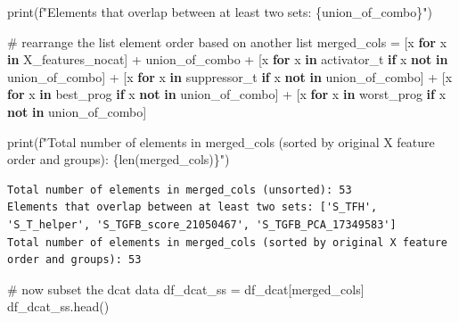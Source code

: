 \documentclass[
  letterpaper,
  DIV=11,
  numbers=noendperiod]{scrartcl}
\newenvironment{Shaded}{\begin{snugshade}}{\end{snugshade}}
\newcommand{\BuiltInTok}[1]{\textcolor[rgb]{0.00,0.23,0.31}{#1}}
\newcommand{\CommentTok}[1]{\textcolor[rgb]{0.37,0.37,0.37}{#1}}
\newcommand{\ControlFlowTok}[1]{\textcolor[rgb]{0.00,0.23,0.31}{\textbf{#1}}}
\newcommand{\KeywordTok}[1]{\textcolor[rgb]{0.00,0.23,0.31}{\textbf{#1}}}
\newcommand{\NormalTok}[1]{\textcolor[rgb]{0.00,0.23,0.31}{#1}}
\newcommand{\OperatorTok}[1]{\textcolor[rgb]{0.37,0.37,0.37}{#1}}
\newcommand{\SpecialCharTok}[1]{\textcolor[rgb]{0.37,0.37,0.37}{#1}}
\newcommand{\SpecialStringTok}[1]{\textcolor[rgb]{0.13,0.47,0.30}{#1}}
\begin{document}
\begin{Shaded}
\begin{Highlighting}[]
\BuiltInTok{print}\NormalTok{(}\SpecialStringTok{f"Elements that overlap between at least two sets: }\SpecialCharTok{\{}\NormalTok{union\_of\_combo}\SpecialCharTok{\}}\SpecialStringTok{"}\NormalTok{)}

\CommentTok{\# rearrange the list element order based on another list}
\NormalTok{merged\_cols }\OperatorTok{=}\NormalTok{ [x }\ControlFlowTok{for}\NormalTok{ x }\KeywordTok{in}\NormalTok{ X\_features\_nocat] }\OperatorTok{+}\NormalTok{ union\_of\_combo }\OperatorTok{+}\NormalTok{ [x }\ControlFlowTok{for}\NormalTok{ x }\KeywordTok{in}\NormalTok{ activator\_t }\ControlFlowTok{if}\NormalTok{ x }\KeywordTok{not} \KeywordTok{in}\NormalTok{ union\_of\_combo] }\OperatorTok{+}\NormalTok{ [x }\ControlFlowTok{for}\NormalTok{ x }\KeywordTok{in}\NormalTok{ suppressor\_t }\ControlFlowTok{if}\NormalTok{ x }\KeywordTok{not} \KeywordTok{in}\NormalTok{ union\_of\_combo] }\OperatorTok{+}\NormalTok{ [x }\ControlFlowTok{for}\NormalTok{ x }\KeywordTok{in}\NormalTok{ best\_prog }\ControlFlowTok{if}\NormalTok{ x }\KeywordTok{not} \KeywordTok{in}\NormalTok{ union\_of\_combo] }\OperatorTok{+}\NormalTok{ [x }\ControlFlowTok{for}\NormalTok{ x }\KeywordTok{in}\NormalTok{ worst\_prog }\ControlFlowTok{if}\NormalTok{ x }\KeywordTok{not} \KeywordTok{in}\NormalTok{ union\_of\_combo]}

\BuiltInTok{print}\NormalTok{(}\SpecialStringTok{f"Total number of elements in merged\_cols (sorted by original X feature order and groups): }\SpecialCharTok{\{}\BuiltInTok{len}\NormalTok{(merged\_cols)}\SpecialCharTok{\}}\SpecialStringTok{"}\NormalTok{)}
\end{Highlighting}
\end{Shaded}

\begin{verbatim}
Total number of elements in merged_cols (unsorted): 53
Elements that overlap between at least two sets: ['S_TFH', 'S_T_helper', 'S_TGFB_score_21050467', 'S_TGFB_PCA_17349583']
Total number of elements in merged_cols (sorted by original X feature order and groups): 53
\end{verbatim}

\begin{Shaded}
\begin{Highlighting}[]
\CommentTok{\# now subset the dcat data}
\NormalTok{df\_dcat\_ss }\OperatorTok{=}\NormalTok{ df\_dcat[merged\_cols]}
\NormalTok{df\_dcat\_ss.head()}
\end{Highlighting}
\end{Shaded}
\end{document}
